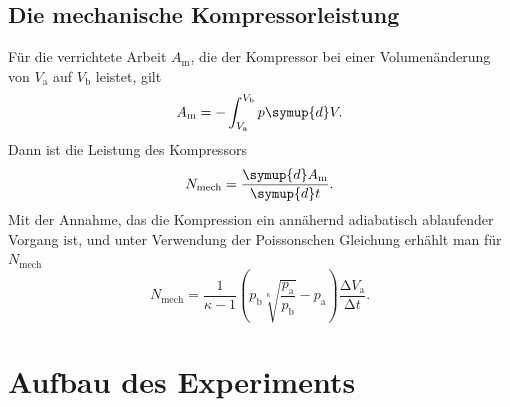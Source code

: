 \documentclass{scrartcl} %
\begin{document}
  \subsection{Die mechanische Kompressorleistung}
  Für die verrichtete Arbeit $A_\text{m}$, die der Kompressor bei einer Volumenänderung von $V_\text{a}$ auf $V_\text{b}$ leistet, gilt
  \begin{equation}
    A_\text{m} = -\int_{V_\text{a}}^{V_\text{b}} p \symup{d}V.
  \label{eqn:arbeitkompressor}
  \end{equation}
  Dann ist die Leistung des Kompressors
  \begin{equation}
    N_\text{mech} = \frac{\symup{d} A_\text{m}}{\symup{d} t}.
    \label{eqn:leistungkompressor1}
  \end{equation}
  Mit der Annahme, das die Kompression ein annähernd adiabatisch ablaufender Vorgang ist, und unter Verwendung der Poissonschen Gleichung erhählt man für $N_\text{mech}$
  \begin{equation}
    N_\text{mech} = \frac{1}{\kappa - 1}  \left(p_\text{b} \sqrt[\kappa]{\frac{p_\text{a}}{p_\text{b}}} - p_\text{a} \right)  \frac{\increment V_\text{a}}{\increment t}.
    \label{eqn:leistungkompressor2}
  \end{equation}
\section{Aufbau des Experiments}
\end{document}
